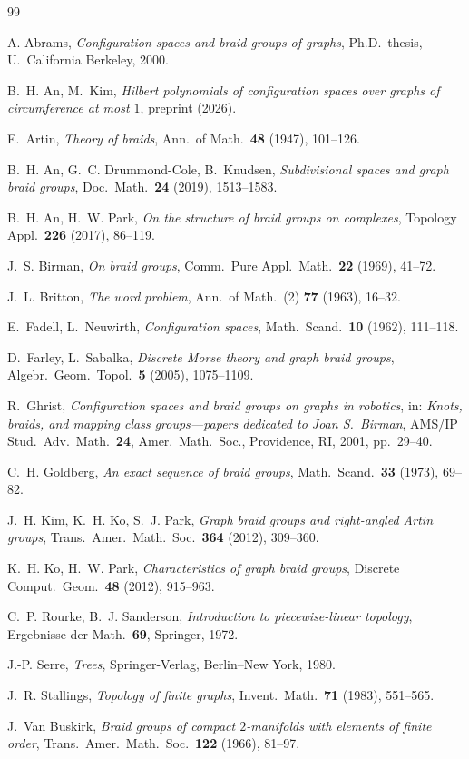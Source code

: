 \documentclass[reqno]{amsart}
\theoremstyle{definition}
\numberwithin{equation}{section}
\begin{document}
\begin{thebibliography}{99}

A. Abrams, \emph{Configuration spaces and braid groups of graphs},
Ph.D.\ thesis, U.~California Berkeley, 2000.

B.~H. An, M.~Kim,
\emph{Hilbert polynomials of configuration spaces over graphs of
circumference at most \(1\)}, preprint (2026).

E.~Artin, \emph{Theory of braids},
Ann.\ of Math.\ \textbf{48} (1947), 101--126.

B.~H. An, G.~C. Drummond-Cole, B.~Knudsen,
\emph{Subdivisional spaces and graph braid groups},
Doc.\ Math.\ \textbf{24} (2019), 1513--1583.

B.~H. An, H.~W. Park,
\emph{On the structure of braid groups on complexes},
Topology Appl.\ \textbf{226} (2017), 86--119.

J.~S. Birman, \emph{On braid groups},
Comm.\ Pure Appl.\ Math.\ \textbf{22} (1969), 41--72.

J.~L. Britton, \emph{The word problem},
Ann.\ of Math.\ (2) \textbf{77} (1963), 16--32.

E.~Fadell, L.~Neuwirth, \emph{Configuration spaces},
Math.\ Scand.\ \textbf{10} (1962), 111--118.

D.~Farley, L.~Sabalka,
\emph{Discrete Morse theory and graph braid groups},
Algebr.\ Geom.\ Topol.\ \textbf{5} (2005), 1075--1109.

R.~Ghrist, \emph{Configuration spaces and braid groups on graphs
in robotics}, in: \emph{Knots, braids, and mapping class
groups---papers dedicated to Joan S.~Birman}, AMS/IP Stud.\ Adv.\
Math.\ \textbf{24}, Amer.\ Math.\ Soc., Providence, RI, 2001,
pp.~29--40.

C.~H. Goldberg,
\emph{An exact sequence of braid groups},
Math.\ Scand.\ \textbf{33} (1973), 69--82.

J.~H. Kim, K.~H. Ko, S.~J. Park,
\emph{Graph braid groups and right-angled Artin groups},
Trans.\ Amer.\ Math.\ Soc.\ \textbf{364} (2012), 309--360.

K.~H. Ko, H.~W. Park,
\emph{Characteristics of graph braid groups},
Discrete Comput.\ Geom.\ \textbf{48} (2012), 915--963.

C.~P. Rourke, B.~J. Sanderson,
\emph{Introduction to piecewise-linear topology},
Ergebnisse der Math.\ \textbf{69}, Springer, 1972.

J.-P. Serre, \emph{Trees},
Springer-Verlag, Berlin--New York, 1980.

J.~R. Stallings, \emph{Topology of finite graphs},
Invent.\ Math.\ \textbf{71} (1983), 551--565.

J.~Van Buskirk,
\emph{Braid groups of compact \(2\)-manifolds with elements of
finite order},
Trans.\ Amer.\ Math.\ Soc.\ \textbf{122} (1966), 81--97.

\end{thebibliography}
\end{document}
